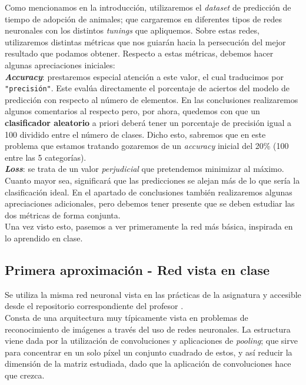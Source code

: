 \documentclass[]{article}
\begin{document}
	Como mencionamos en la introducción, utilizaremos el \textit{dataset} de predicción de tiempo de adopción de animales; que cargaremos en diferentes tipos de redes neuronales con los distintos \textit{tunings} que apliquemos. Sobre estas redes, utilizaremos distintas métricas que nos guiarán hacia la persecución del mejor resultado que podamos obtener. Respecto a estas métricas, debemos hacer algunas apreciaciones iniciales:\\
	
	{\large \textbf{\textit{Accuracy}}}: prestaremos especial atención a este valor, el cual traducimos por \verb|"precisión"|. Este evalúa directamente el porcentaje de aciertos del modelo de predicción con respecto al número de elementos. En las conclusiones realizaremos algunos comentarios al respecto pero, por ahora, quedemos con que un \textbf{clasificador aleatorio} a priori deberá tener un porcentaje de precisión igual a 100 dividido entre el número de clases. Dicho esto, sabremos que en este problema que estamos tratando gozaremos de un \textit{accuracy} inicial del 20\% (100 entre las 5 categorías).\\
	
	{\large \textbf{\textit{Loss}}}: se trata de un valor \textit{perjudicial} que pretendemos minimizar al máximo. Cuanto mayor sea, significará que las predicciones se alejan más de lo que sería la clasificación ideal. En el apartado de conclusiones también realizaremos algunas apreciaciones adicionales, pero debemos tener presente que se deben estudiar las dos métricas de forma conjunta.\\
	
	Una vez visto esto, pasemos a ver primeramente la red más básica, inspirada en lo aprendido en clase.

	\subsection{Primera aproximación - Red vista en clase}
	
		Se utiliza la misma red neuronal vista en las prácticas de la asignatura y accesible desde el repositorio correspondiente del profesor \cite{red-clase}.\\
	
		Consta de una arquitectura muy típicamente vista en problemas de reconocimiento de imágenes a través del uso de redes neuronales. La estructura viene dada por la utilización de convoluciones y aplicaciones de \textit{pooling}; que sirve para concentrar en un solo píxel un conjunto cuadrado de estos, y así reducir la dimensión de la matriz estudiada, dado que la aplicación de convoluciones hace que crezca.\\
		
\end{document}
